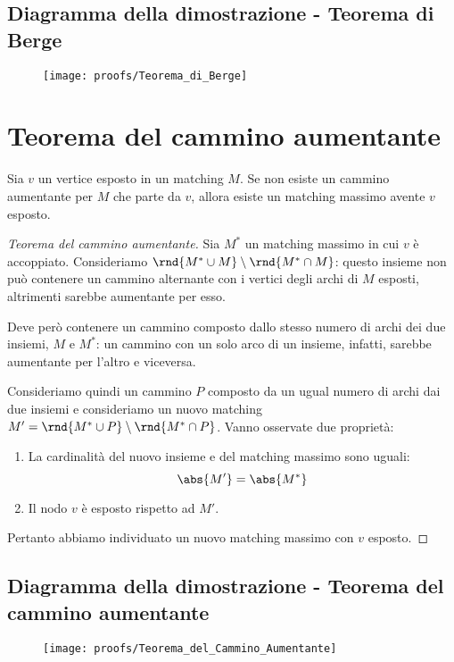 \documentclass[\main/main.tex]{subfiles}
\begin{document}
\subsection{Diagramma della dimostrazione - Teorema di Berge}
\begin{figure}
	\texttt{[image: proofs/Teorema\_di\_Berge]}
\end{figure}
\clearpage
\section{Teorema del cammino aumentante}

\begin{theorem}
	Sia \(v\) un vertice esposto in un matching \(M\). Se non esiste un cammino aumentante per \(M\) che parte da \(v\), allora esiste un matching massimo avente \(v\) esposto.
\end{theorem}

\begin{proof}[Teorema del cammino aumentante]
	Sia \(M^*\) un matching massimo in cui \(v\) è accoppiato. Consideriamo \(\rnd{M^*\cup M}\setminus\rnd{M^* \cap M}\): questo insieme non può contenere un cammino alternante con i vertici degli archi di \(M\) esposti, altrimenti sarebbe aumentante per esso.

	Deve però contenere un cammino composto dallo stesso numero di archi dei due insiemi, \(M\) e \(M^*\): un cammino con un solo arco di un insieme, infatti, sarebbe aumentante per l'altro e viceversa.

	Consideriamo quindi un cammino \(P\) composto da un ugual numero di archi dai due insiemi e consideriamo un nuovo matching \(M' = \rnd{M^*\cup P}\setminus\rnd{M^* \cap P}\). Vanno osservate due proprietà:

	\begin{enumerate}
		\item La cardinalità del nuovo insieme e del matching massimo sono uguali:
		      \[
			      \abs{M'} = \abs{M^*}
		      \]
		\item Il nodo \(v\) è esposto rispetto ad \(M'\).
	\end{enumerate}
	Pertanto abbiamo individuato un nuovo matching massimo con \(v\) esposto.
\end{proof}
\clearpage
\subsection{Diagramma della dimostrazione - Teorema del cammino aumentante}
\begin{figure}
	\texttt{[image: proofs/Teorema\_del\_Cammino\_Aumentante]}
\end{figure}
\clearpage
\end{document}
